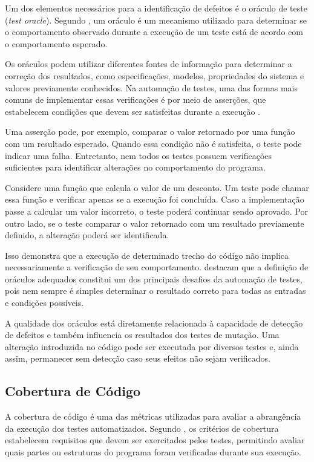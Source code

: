 Um dos elementos necessários para a identificação de defeitos é o oráculo de teste (\textit{test oracle}). Segundo , um oráculo é um mecanismo utilizado para determinar se o comportamento observado durante a execução de um teste está de acordo com o comportamento esperado.

Os oráculos podem utilizar diferentes fontes de informação para determinar a correção dos resultados, como especificações, modelos, propriedades do sistema e valores previamente conhecidos. Na automação de testes, uma das formas mais comuns de implementar essas verificações é por meio de asserções, que estabelecem condições que devem ser satisfeitas durante a execução \cite{ammann2016,barr2015}.

Uma asserção pode, por exemplo, comparar o valor retornado por uma função com um resultado esperado. Quando essa condição não é satisfeita, o teste pode indicar uma falha. Entretanto, nem todos os testes possuem verificações suficientes para identificar alterações no comportamento do programa.

Considere uma função que calcula o valor de um desconto. Um teste pode chamar essa função e verificar apenas se a execução foi concluída. Caso a implementação passe a calcular um valor incorreto, o teste poderá continuar sendo aprovado. Por outro lado, se o teste comparar o valor retornado com um resultado previamente definido, a alteração poderá ser identificada.

Isso demonstra que a execução de determinado trecho do código não implica necessariamente a verificação de seu comportamento.  destacam que a definição de oráculos adequados constitui um dos principais desafios da automação de testes, pois nem sempre é simples determinar o resultado correto para todas as entradas e condições possíveis.

A qualidade dos oráculos está diretamente relacionada à capacidade de detecção de defeitos e também influencia os resultados dos testes de mutação. Uma alteração introduzida no código pode ser executada por diversos testes e, ainda assim, permanecer sem detecção caso seus efeitos não sejam verificados.

\subsection{Cobertura de Código}

A cobertura de código é uma das métricas utilizadas para avaliar a abrangência da execução dos testes automatizados. Segundo , os critérios de cobertura estabelecem requisitos que devem ser exercitados pelos testes, permitindo avaliar quais partes ou estruturas do programa foram verificadas durante sua execução.


